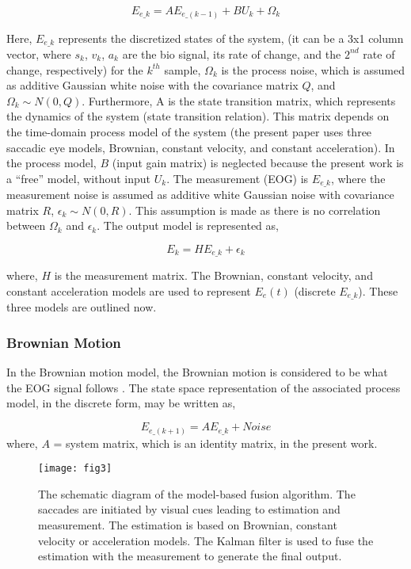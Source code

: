 \documentclass[transmag]{IEEEtran}
\begin{document}
\begin{equation}
E_{e\_k} = AE_{e\_(k-1)} + BU_k + \Omega_k
\end{equation}


Here, $E_{e\_k}$ represents the discretized states of the system, (it can be a 3x1 column vector, where $s_k$, $v_k$, $a_k$ are the bio signal, its rate of change, and the $2^{nd}$ rate of change, respectively) for the $k^{th}$ sample,  $\Omega_k$ is the process noise, which is assumed as additive Gaussian white noise with the covariance matrix $Q$, and $\Omega_k \sim N(0,Q)$. Furthermore, A is the state transition matrix, which represents the dynamics of the system (state transition relation). This matrix depends on the time-domain process model of the system (the present paper uses three saccadic eye models, Brownian, constant velocity, and constant acceleration). In the process model, $B$ (input gain matrix) is neglected because the present work is a “free” model, without input $U_k$. The measurement (EOG) is $E_{e\_k}$, where the measurement noise is assumed as additive white Gaussian noise with covariance matrix $R$, $\epsilon_k \sim N(0,R)$.  This assumption is made as there is no correlation between $\Omega_k$ and $\epsilon_k$. The output model is represented as, 

\begin{equation}
E_k = HE_{e\_k} + \epsilon_k 
\end{equation}

where, $H$ is the measurement matrix. The Brownian, constant velocity, and constant acceleration models are used to represent $E_e(t)$ (discrete $E_{e\_k}$). These three models are outlined now.

\subsubsection{Brownian Motion}

In the Brownian motion model, the Brownian motion is considered to be what the EOG signal follows \cite{ref5}. The state space representation of the associated process model, in the discrete form, may be written as, 

\begin{equation}
E_{e\_(k+1)} = AE_{e\_k} + Noise 
\end{equation}
where,  $A$ =  system matrix, which is an identity matrix, in the present work.

\begin{figure*}[h]
	\centerline{\texttt{[image: fig3]}}
	\caption{The schematic diagram of the model-based fusion algorithm. The saccades are initiated by visual cues leading to estimation and measurement. The estimation is based on Brownian, constant velocity or acceleration models. The Kalman filter is used to fuse the estimation with the measurement to generate the final output. }
	\label{fig3}
\end{figure*}
\end{document}

